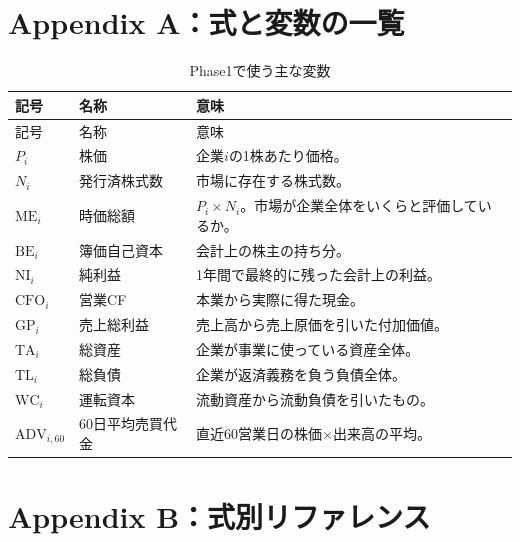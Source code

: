 \documentclass[11pt,a4paper]{article}
\newcommand{\BE}{\mathrm{BE}}
\newcommand{\ME}{\mathrm{ME}}
\newcommand{\NI}{\mathrm{NI}}
\newcommand{\TA}{\mathrm{TA}}
\newcommand{\TL}{\mathrm{TL}}
\newcommand{\GP}{\mathrm{GP}}
\newcommand{\CFO}{\mathrm{CFO}}
\newcommand{\WC}{\mathrm{WC}}
\newcommand{\ADV}{\mathrm{ADV}}
\begin{document}
\clearpage
\section{Appendix A：式と変数の一覧}

\begin{longtable}{p{30mm}p{34mm}p{78mm}}
\caption{Phase1で使う主な変数}\label{tab:variables}\\
\toprule
記号 & 名称 & 意味 \\
\midrule
\endfirsthead
\toprule
記号 & 名称 & 意味 \\
\midrule
\endhead
$P_i$ & 株価 & 企業$i$の1株あたり価格。 \\
$N_i$ & 発行済株式数 & 市場に存在する株式数。 \\
$\ME_i$ & 時価総額 & $P_i\times N_i$。市場が企業全体をいくらと評価しているか。 \\
$\BE_i$ & 簿価自己資本 & 会計上の株主の持ち分。 \\
$\NI_i$ & 純利益 & 1年間で最終的に残った会計上の利益。 \\
$\CFO_i$ & 営業CF & 本業から実際に得た現金。 \\
$\GP_i$ & 売上総利益 & 売上高から売上原価を引いた付加価値。 \\
$\TA_i$ & 総資産 & 企業が事業に使っている資産全体。 \\
$\TL_i$ & 総負債 & 企業が返済義務を負う負債全体。 \\
$\WC_i$ & 運転資本 & 流動資産から流動負債を引いたもの。 \\
$\ADV_{i,60}$ & 60日平均売買代金 & 直近60営業日の株価×出来高の平均。 \\
\bottomrule
\end{longtable}

\clearpage
\section{Appendix B：式別リファレンス}
\end{document}
